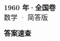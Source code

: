 \documentclass[zihao=-4, a4paper]{ctexart}
\begin{document}
\begin{center}
  {\Large\bfseries 1960 年·全国卷}\\[4pt]
  {\large 数学 · 简答版}
\end{center}
\medskip
{}

\clearpage
{}
\begin{center}{\Large\bfseries 答案速查}\end{center}
\medskip

\end{document}
